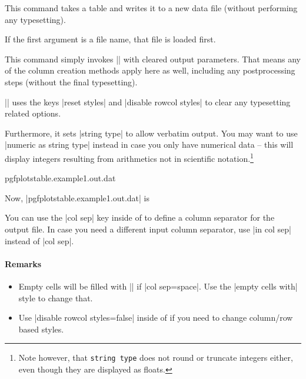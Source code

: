 \begin{command}{\pgfplotstablesave{}}
    This command takes a table and writes it to a new data file (without
    performing any typesetting).

    If the first argument is a file name, that file is loaded first.

    This command simply invokes |\pgfplotstabletypeset| with cleared output
    parameters. That means any of the column creation methods apply here as
    well, including any postprocessing steps (without the final typesetting).

    |\pgfplotstablesave| uses the keys |reset styles| and
    |disable rowcol styles| to clear any typesetting related options.

    Furthermore, it sets |string type| to allow verbatim output. You may want
    to use |numeric as string type| instead in case you only have numerical
    data -- this will display integers resulting from arithmetics not in
    scientific notation.\footnote{Note however, that \texttt{string type} does
    not round or truncate integers either, even though they are displayed as
    floats.}
\begin{codeexample}
    {pgfplotstable.example1.out.dat}
\end{codeexample}
    Now, |pgfplotstable.example1.out.dat| is
    

    You can use the |col sep| key inside of  to define a column
    separator for the output file. In case you need a different input column
    separator, use |in col sep| instead of |col sep|.


    \paragraph{Remarks}

    \begin{itemize}
        \item Empty cells will be filled with |{}| if |col sep=space|. Use
            the |empty cells with| style to change that.
        \item Use |disable rowcol styles=false| inside of  if
            you need to change column/row based styles.
    \end{itemize}
\end{command}


